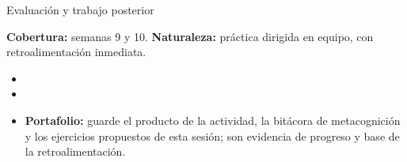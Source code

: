 \documentclass[10pt,aspectratio=169]{beamer}
\begin{document}
\begin{frame}{Evaluación y trabajo posterior}
  \small
  \begin{evalbox}
    \textbf{Cobertura:} semanas 9 y 10. \textbf{Naturaleza:} práctica dirigida en equipo, con retroalimentación inmediata.
  \end{evalbox}
  \begin{itemize}
    \item \criterios
    \item \declaracionia
    \item \textbf{Portafolio:} guarde el producto de la actividad, la bitácora de metacognición y los ejercicios propuestos de esta sesión; son evidencia de progreso y base de la retroalimentación.
  \end{itemize}
\end{frame}
\end{document}
